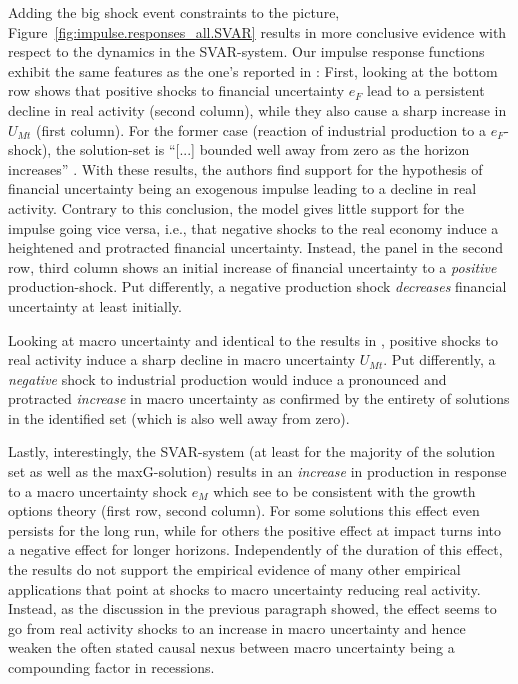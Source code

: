 \documentclass[a4paper,11pt,listof=nochaptergap,oneside,pointednumbers,bibtotoc,bigheadings,liststotoc,hidelinks]{scrbook}
\theoremstyle{mysatz}
\theoremstyle{mydefinition}
\theoremstyle{mytheorem}
\theoremstyle{mybemerkung}
\begin{document}
Adding the big shock event constraints to the picture, Figure~\ref{fig:impulse.responses_all.SVAR} results in more conclusive evidence with respect to the dynamics in the SVAR-system. Our impulse response functions exhibit the same features as the one's reported in \citet{ludvigsonetal:19}: First, looking at the bottom row shows that positive shocks to financial uncertainty $e_F$ lead to a persistent decline in real activity (second column), while they also cause a sharp increase in $U_{Mt}$ (first column). For the former case (reaction of industrial production to a $e_F$-shock), the solution-set is ``[...] bounded well away from zero as the horizon increases'' \citep[p. 22]{ludvigsonetal:19}. With these results, the authors find support for the hypothesis of financial uncertainty being an exogenous impulse leading to a decline in real activity. Contrary to this conclusion, the model gives little support for the impulse going vice versa, i.e., that negative shocks to the real economy induce a heightened and protracted financial uncertainty. Instead, the panel in the second row, third column shows an initial increase of financial uncertainty to a \textit{positive} production-shock. Put differently, a negative production shock \textit{decreases} financial uncertainty at least initially.

Looking at macro uncertainty and identical to the results in \citet{ludvigsonetal:19}, positive shocks to real activity induce a sharp decline in macro uncertainty $U_{Mt}$. Put differently, a \textit{negative} shock to industrial production would induce a pronounced and protracted \textit{increase} in macro uncertainty as confirmed by the entirety of solutions in the identified set (which is also well away from zero). 

Lastly, interestingly, the SVAR-system (at least for the majority of the solution set as well as the maxG-solution) results in an \textit{increase} in production in response to a macro uncertainty shock $e_{M}$ which \citet{ludvigsonetal:19} see to be consistent with the growth options theory (first row, second column). For some solutions this effect even persists for the long run, while for others the positive effect at impact turns into a negative effect for longer horizons. Independently of the duration of this effect, the results do not support the empirical evidence of many other empirical applications that point at shocks to macro uncertainty reducing real activity. Instead, as the discussion in the previous paragraph showed, the effect seems to go from real activity shocks to an increase in macro uncertainty and hence weaken the often stated causal nexus between macro uncertainty being a compounding factor in recessions. 
\end{document}
